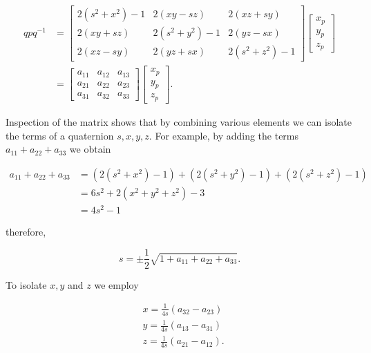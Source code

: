 $$
\begin{aligned}
q p q^{-1} & =\left[\begin{array}{ccc}
2\left(s^{2}+x^{2}\right)-1 & 2(x y-s z) & 2(x z+s y) \\
2(x y+s z) & 2\left(s^{2}+y^{2}\right)-1 & 2(y z-s x) \\
2(x z-s y) & 2(y z+s x) & 2\left(s^{2}+z^{2}\right)-1
\end{array}\right]\left[\begin{array}{l}
x_{p} \\
y_{p} \\
z_{p}
\end{array}\right] \\
& =\left[\begin{array}{lll}
a_{11} & a_{12} & a_{13} \\
a_{21} & a_{22} & a_{23} \\
a_{31} & a_{32} & a_{33}
\end{array}\right]\left[\begin{array}{l}
x_{p} \\
y_{p} \\
z_{p}
\end{array}\right] .
\end{aligned}
$$

Inspection of the matrix shows that by combining various elements we can isolate the terms of a quaternion $s, x, y, z$. For example, by adding the terms $a_{11}+a_{22}+a_{33}$ we obtain

$$
\begin{aligned}
a_{11}+a_{22}+a_{33} & =\left(2\left(s^{2}+x^{2}\right)-1\right)+\left(2\left(s^{2}+y^{2}\right)-1\right)+\left(2\left(s^{2}+z^{2}\right)-1\right) \\
& =6 s^{2}+2\left(x^{2}+y^{2}+z^{2}\right)-3 \\
& =4 s^{2}-1
\end{aligned}
$$

therefore,

$$
s=\pm \frac{1}{2} \sqrt{1+a_{11}+a_{22}+a_{33}} .
$$

To isolate $x, y$ and $z$ we employ

$$
\begin{aligned}
& x=\frac{1}{4 s}\left(a_{32}-a_{23}\right) \\
& y=\frac{1}{4 s}\left(a_{13}-a_{31}\right) \\
& z=\frac{1}{4 s}\left(a_{21}-a_{12}\right) .
\end{aligned}
$$

